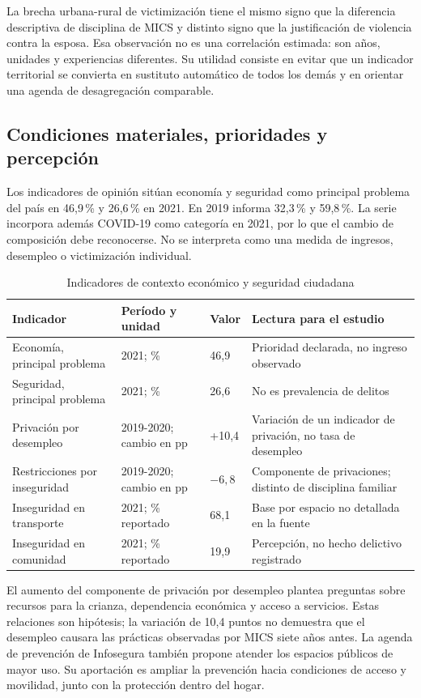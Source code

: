 La brecha urbana-rural de victimización tiene el mismo signo que la diferencia
descriptiva de disciplina de MICS y distinto signo que la justificación de
violencia contra la esposa. Esa observación no es una correlación estimada:
son años, unidades y experiencias diferentes. Su utilidad consiste en evitar
que un indicador territorial se convierta en sustituto automático de todos
los demás y en orientar una agenda de desagregación comparable.

\subsection{Condiciones materiales, prioridades y percepción}
Los indicadores de opinión sitúan economía y seguridad como principal problema del país
en 46,9\,\% y 26,6\,\% en 2021. En 2019 informa 32,3\,\% y 59,8\,\%.
La serie incorpora además COVID-19 como categoría en 2021, por lo que el
cambio de composición debe reconocerse. No se interpreta como una medida
de ingresos, desempleo o victimización individual.

\begin{table}[htbp]
\centering\small
\caption{Indicadores de contexto económico y seguridad ciudadana}\label{tab:infosegura_contexto}
\begin{tabularx}{\textwidth}{@{}Yp{2.5cm}p{2.1cm}Y@{}}\toprule
Indicador & Período y unidad & Valor & Lectura para el estudio\\\midrule
Economía, principal problema & 2021; \% & 46,9 & Prioridad declarada, no ingreso observado\\
Seguridad, principal problema & 2021; \% & 26,6 & No es prevalencia de delitos\\
Privación por desempleo & 2019-2020; cambio en pp & +10,4 & Variación de un indicador de privación, no tasa de desempleo\\
Restricciones por inseguridad & 2019-2020; cambio en pp & $-6,8$ & Componente de privaciones; distinto de disciplina familiar\\
Inseguridad en transporte & 2021; \% reportado & 68,1 & Base por espacio no detallada en la fuente\\
Inseguridad en comunidad & 2021; \% reportado & 19,9 & Percepción, no hecho delictivo registrado\\\bottomrule
\end{tabularx}
\end{table}

El aumento del componente de privación por desempleo plantea preguntas sobre
recursos para la crianza, dependencia económica y acceso a servicios. Estas
relaciones son hipótesis; la variación de 10,4 puntos no demuestra que el
desempleo causara las prácticas observadas por MICS siete años antes.
La agenda de prevención de Infosegura también propone atender los espacios públicos de mayor
uso. Su aportación es ampliar la prevención hacia condiciones de acceso y
movilidad, junto con la protección dentro del hogar.


